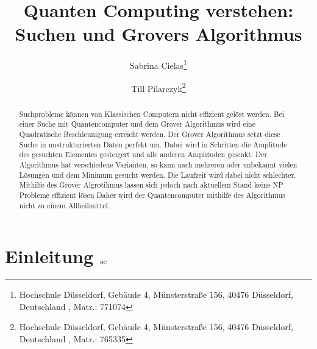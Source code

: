 \documentclass[utf8,biblatex]{lni}
\begin{document}
\title[Suchen und Grovers]{Quanten Computing verstehen: Suchen und Grovers Algorithmus}
\author[Sabrina Cielas \and Till Pilarczyk]
{Sabrina Cielas\footnote{Hochschule Düsseldorf, Gebäude 4, Münsterstraße 156, 40476 Düsseldorf, Deutschland , Matr.: 771074} \and
 Till Pilarczyk\footnote{Hochschule Düsseldorf, Gebäude 4, Münsterstraße 156, 40476 Düsseldorf, Deutschland , Matr.: 765335}}
\maketitle %
\thispagestyle{fancy}

\begin{abstract}
Suchprobleme können von Klassischen Computern nicht effizient gelöst werden. Bei einer Suche mit Quantencomputer und dem Grover Algorithmus wird eine Quadratische Beschleunigung erreicht werden. Der Grover Algorithmus setzt diese Suche in unstrukturierten Daten perfekt um. Dabei wird in Schritten die Amplitude des gesuchten Elementes gesteigert und alle anderen Amplituden gesenkt. Der Algorithmus hat verschiedene Varianten, so kann nach mehreren oder unbekannt vielen Lösungen und dem Minimum gesucht werden. Die Laufzeit wird dabei nicht schlechter. Mithilfe des Grover Algrotihmus lassen sich jedoch nach aktuellem Stand keine NP Probleme effizient lösen Daher wird der Quantencomputer mithilfe des Algorithmus nicht zu einem Allheilmittel.
\end{abstract}


\section{Einleitung $\mathbf{\textsubscript{\small sc}}$}

\end{document}
